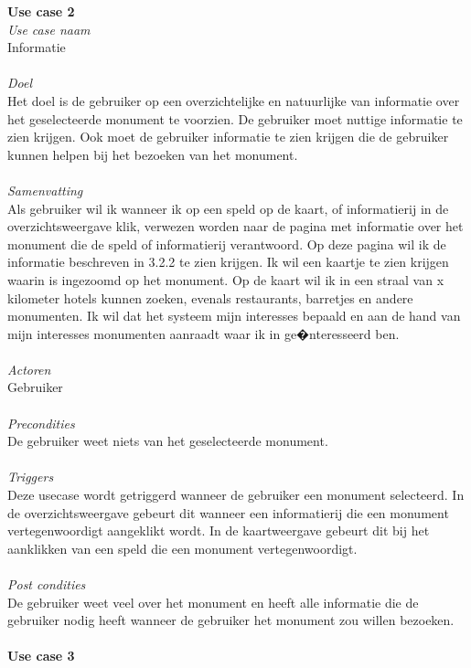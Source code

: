 \documentclass[a4paper,10pt]{article}
\begin{document}
			\textbf{Use case 2}\\
			\textit{Use case naam}\\
			Informatie\\ \\
			\textit{Doel}\\
			Het doel is de gebruiker op een overzichtelijke en natuurlijke van informatie over het geselecteerde monument te voorzien. De gebruiker moet nuttige informatie te zien krijgen. Ook moet de gebruiker informatie te zien krijgen die de gebruiker kunnen helpen bij het bezoeken van het monument.\\ \\
			\textit{Samenvatting}\\
			Als gebruiker wil ik wanneer ik op een speld op de kaart, of informatierij in de overzichtsweergave klik, verwezen worden naar de pagina met informatie over het monument die de speld of informatierij verantwoord. Op deze pagina wil ik de informatie beschreven in 3.2.2 te zien krijgen. Ik wil een kaartje te zien krijgen waarin is ingezoomd op het monument. Op de kaart wil ik in een straal van x kilometer hotels kunnen zoeken, evenals restaurants, barretjes en andere monumenten. Ik wil dat het systeem mijn interesses bepaald en aan de hand van mijn interesses monumenten aanraadt waar ik in ge�nteresseerd ben.\\ \\
			\textit{Actoren}\\
			Gebruiker\\ \\
			\textit{Precondities}\\
			De gebruiker weet niets van het geselecteerde monument.\\ \\
			\textit{Triggers}\\
			Deze usecase wordt getriggerd wanneer de gebruiker een monument selecteerd. In de overzichtsweergave gebeurt dit wanneer een informatierij die een monument vertegenwoordigt aangeklikt wordt. In de kaartweergave gebeurt dit bij het aanklikken van een speld die een monument vertegenwoordigt.\\ \\
			\textit{Post condities}\\
			De gebruiker weet veel over het monument en heeft alle informatie die de gebruiker nodig heeft wanneer de gebruiker het monument zou willen bezoeken.\\ \\
			\textbf{Use case 3}\\
\end{document}
